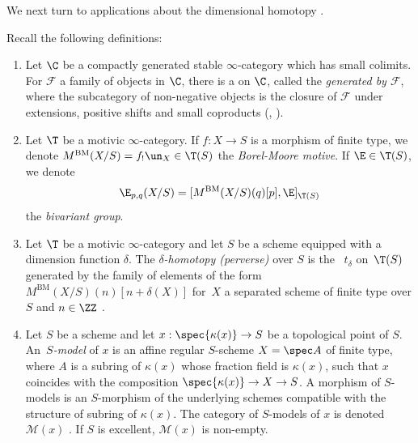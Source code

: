 We next turn to applications about the dimensional homotopy \tstructure \cite{BD1}.

\begin{num}\label{num:recall_delta_htp}
Recall the following definitions:
\begin{enumerate}
\item
Let $\C$ be a compactly generated stable $\infty$-category which has small colimits. For $\mathcal{F}$ a family of objects in $\C$, there is a \tstructure on $\C$, called the \emph{\tstructure generated by $\mathcal{F}$}, where the subcategory of non-negative objects is the closure of $\mathcal{F}$ under extensions, positive shifts and small coproducts (\cite[Th.\,1.2.6]{BD1}, \cite[Prop.\,2.1.70]{AyoubThesis}).

\item
Let $\T$ be a motivic $\infty$-category. If $f:X\to S$ is a morphism of finite type, we denote $M^{\mathrm{BM}}(X/S)=f_!\un_X\in\T(S)$ the \emph{Borel-Moore motive}. If $\E\in\T(S)$, we denote
\[\E_{p,q}(X/S)=[M^{\mathrm{BM}}(X/S)(q)[p],\E]_{\T(S)}\]
the \emph{bivariant group}.

\item
Let $\T$ be a motivic $\infty$-category and let $S$ be a scheme equipped with a dimension function $\delta$. The \emph{$\delta$-homotopy (perverse) \tstructure} over $S$ is the \tstructure~$t_\delta$ on~$\T(S)$ generated by the family of elements of the form $M^{\mathrm{BM}}(X/S)(n)[n+\delta(X)]$ for~$X$ a separated scheme of finite type over $S$ and $n\in\ZZ$ \cite[Def.\,2.1.1]{BD1}.

\item
Let $S$ be a scheme and let $x:\spec{\kappa(x)}\to S$ be a topological point of $S$. An~\emph{$S$-model} of $x$ is an affine regular $S$-scheme $X=\spec A$ of finite type, where $A$ is a subring of $\kappa(x)$ whose fraction field is $\kappa(x)$, such that $x$ coincides with the composition $\spec{\kappa(x)}\to X\to S$. A morphism of $S$-models is an $S$-morphism of the underlying schemes compatible with the structure of subring of $\kappa(x)$.
The category of $S$-models of $x$ is denoted $\mathcal{M}(x)$ \cite[Def.\,3.2.1]{BD1}. If $S$ is excellent, $\mathcal{M}(x)$ is non-empty.


\end{enumerate}
\end{num}
